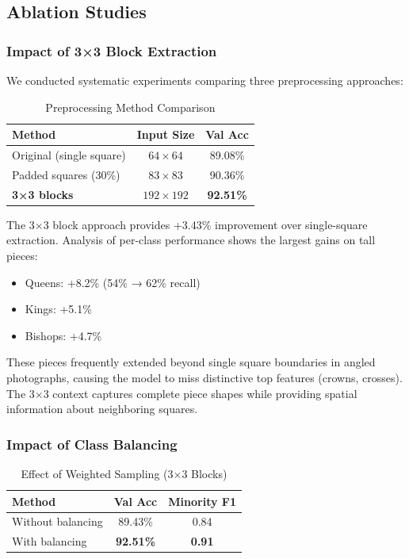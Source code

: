 \documentclass[conference]{IEEEtran}
\begin{document}
\subsection{Ablation Studies}

\subsubsection{Impact of 3×3 Block Extraction}

We conducted systematic experiments comparing three preprocessing approaches:

\begin{table}[h]
\centering
\caption{Preprocessing Method Comparison}
\begin{tabular}{lcc}
\toprule
\textbf{Method} & \textbf{Input Size} & \textbf{Val Acc} \\
\midrule
Original (single square) & $64 \times 64$ & 89.08\% \\
Padded squares (30\%) & $83 \times 83$ & 90.36\% \\
\textbf{3×3 blocks} & $192 \times 192$ & \textbf{92.51\%} \\
\bottomrule
\end{tabular}
\end{table}

The 3×3 block approach provides +3.43\% improvement over single-square extraction. Analysis of per-class performance shows the largest gains on tall pieces:
\begin{itemize}
    \item Queens: +8.2\% (54\% → 62\% recall)
    \item Kings: +5.1\% 
    \item Bishops: +4.7\%
\end{itemize}

These pieces frequently extended beyond single square boundaries in angled photographs, causing the model to miss distinctive top features (crowns, crosses). The 3×3 context captures complete piece shapes while providing spatial information about neighboring squares.

\subsubsection{Impact of Class Balancing}

\begin{table}[h]
\centering
\caption{Effect of Weighted Sampling (3×3 Blocks)}
\begin{tabular}{lcc}
\toprule
\textbf{Method} & \textbf{Val Acc} & \textbf{Minority F1} \\
\midrule
Without balancing & 89.43\% & 0.84 \\
With balancing & \textbf{92.51\%} & \textbf{0.91} \\
\bottomrule
\end{tabular}
\end{table}
\end{document}
